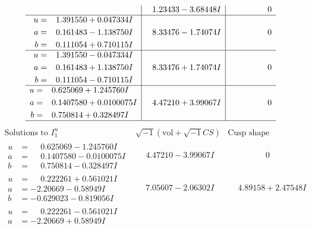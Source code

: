 \documentclass[1p]{elsarticle_modified}
\theoremstyle{definition}
\newcommand{\I}{\sqrt{-1}}
\begin{document}
$$\begin{array}{c|c|c}
 & \phantom{-}1.23433 - 3.68448 I & \phantom{-0.000000 } 0 \\ \hline\begin{aligned}
u &= \phantom{-}1.391550 + 0.047334 I \\
a &= \phantom{-}0.161483 - 1.138750 I \\
b &= \phantom{-}0.111054 + 0.710115 I\end{aligned}
 & \phantom{-}8.33476 - 1.74074 I & \phantom{-0.000000 } 0 \\ \hline\begin{aligned}
u &= \phantom{-}1.391550 - 0.047334 I \\
a &= \phantom{-}0.161483 + 1.138750 I \\
b &= \phantom{-}0.111054 - 0.710115 I\end{aligned}
 & \phantom{-}8.33476 + 1.74074 I & \phantom{-0.000000 } 0 \\ \hline\begin{aligned}
u &= \phantom{-}0.625069 + 1.245760 I \\
a &= \phantom{-}0.1407580 + 0.0100075 I \\
b &= \phantom{-}0.750814 + 0.328497 I\end{aligned}
 & \phantom{-}4.47210 + 3.99067 I & \phantom{-0.000000 } 0\\
 \hline 
 \end{array}$$\newpage$$\begin{array}{c|c|c}  
\text{Solutions to }I^u_{1}& \I (\text{vol} + \sqrt{-1}CS) & \text{Cusp shape}\\
 \hline 
\begin{aligned}
u &= \phantom{-}0.625069 - 1.245760 I \\
a &= \phantom{-}0.1407580 - 0.0100075 I \\
b &= \phantom{-}0.750814 - 0.328497 I\end{aligned}
 & \phantom{-}4.47210 - 3.99067 I & \phantom{-0.000000 } 0 \\ \hline\begin{aligned}
u &= \phantom{-}0.222261 + 0.561021 I \\
a &= -2.20669 - 0.58949 I \\
b &= -0.629023 - 0.819056 I\end{aligned}
 & \phantom{-}7.05607 - 2.06302 I & \phantom{-}4.89158 + 2.47548 I \\ \hline\begin{aligned}
u &= \phantom{-}0.222261 - 0.561021 I \\
a &= -2.20669 + 0.58949 I \\

\end{aligned}
\end{array}$$
\end{document}
